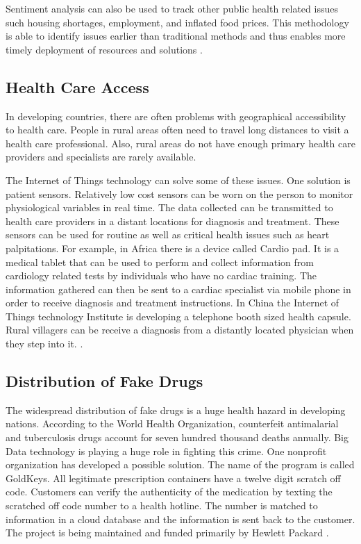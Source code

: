 \documentclass[sigconf]{acmart}
\begin{document}
Sentiment analysis can also be used to track other public health related issues such housing shortages, employment, and inflated food prices. This methodology is able to identify issues earlier than traditional methods and thus enables more timely deployment of resources and solutions \cite{www-google-GloPls}. 

\subsection{Health Care Access}
In developing countries, there are often problems with geographical accessibility to health care. People in rural areas often need to travel long distances to visit a health care professional. Also, rural areas do not have enough primary health care providers and specialists are rarely available. 

The Internet of Things technology can solve some of these issues. One solution is patient sensors. Relatively low cost sensors can be worn on the person to monitor physiological variables in real time.  The data collected can be transmitted to health care providers in a distant locations for diagnosis and treatment. These sensors can be used for routine as well as critical health issues such as heart palpitations. For example, in Africa there is a device called Cardio pad. It is a medical tablet that can be used to perform and collect information from cardiology related tests by individuals who have no cardiac training. The information gathered can then be sent to a cardiac specialist via mobile phone in order to receive diagnosis and treatment instructions. In China the Internet of Things technology Institute is developing a telephone booth sized health capsule. Rural villagers can be receive a diagnosis from a distantly located physician when they step into it. \cite{DevEcon}. 

\subsection{Distribution of Fake Drugs}
The widespread distribution of fake drugs is a huge health hazard in developing nations. According to the World Health Organization, counterfeit antimalarial and tuberculosis drugs account for seven hundred thousand deaths annually. Big Data technology is playing a huge role in fighting this crime.  One nonprofit organization has developed a possible solution. The name of the program is called GoldKeys. All legitimate prescription containers have a twelve digit scratch off code. Customers can verify the authenticity of the medication by texting the scratched off code number to a health hotline.  The number is matched to information in a cloud database and the information is sent back to the customer. The project is being maintained and funded primarily by Hewlett Packard \cite{DevEcon}. 
\end{document}
